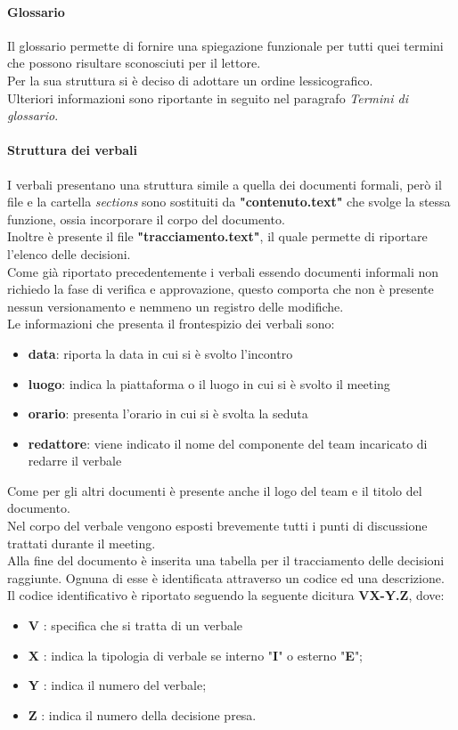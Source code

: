\paragraph{Glossario}
Il glossario permette di fornire una spiegazione funzionale per tutti quei termini che possono risultare sconosciuti per il lettore.\\
Per la sua struttura si è deciso di adottare un ordine lessicografico.\\
Ulteriori informazioni sono riportante in seguito nel paragrafo \textit{Termini di glossario}.

\paragraph{Struttura dei verbali} 
I verbali presentano una struttura simile a quella dei documenti formali, però il file e la cartella \textit{sections} sono sostituiti da \textbf{"contenuto.text"} che svolge la stessa funzione, ossia incorporare il corpo del documento.\\
Inoltre è presente il file \textbf{"tracciamento.text"}, il quale permette di riportare l'elenco delle decisioni.\\
Come già riportato precedentemente i verbali essendo documenti informali non richiedo la fase di verifica e approvazione, questo comporta che non è presente nessun versionamento e nemmeno un registro delle modifiche.\\
Le informazioni che presenta il frontespizio dei verbali sono:
\begin{itemize}
	\item\textbf{data}: riporta la data in cui si è svolto l'incontro
	\item\textbf{luogo}: indica la piattaforma o il luogo in cui si è svolto il meeting
	\item\textbf{orario}: presenta l'orario in cui si è svolta la seduta
	\item\textbf{redattore}: viene indicato il nome del componente del team incaricato di redarre il verbale
\end{itemize}
Come per gli altri documenti è presente anche il logo del team e il titolo del documento.\\
Nel corpo del verbale vengono esposti brevemente tutti i punti di discussione trattati durante il meeting.\\
Alla fine del documento è inserita una tabella per il tracciamento delle decisioni raggiunte. Ognuna di esse è identificata attraverso un codice ed una descrizione.\\
Il codice identificativo è riportato seguendo la seguente dicitura \textbf{VX-Y.Z}, dove:
\begin{itemize}
    \item\textbf{V} : specifica che si tratta di un verbale
	\item\textbf{X} : indica la tipologia di verbale se interno "\textbf{I}" o esterno "\textbf{E}";
	\item\textbf{Y} : indica il numero del verbale;
	\item\textbf{Z} : indica il numero della decisione presa.
\end{itemize}
    
